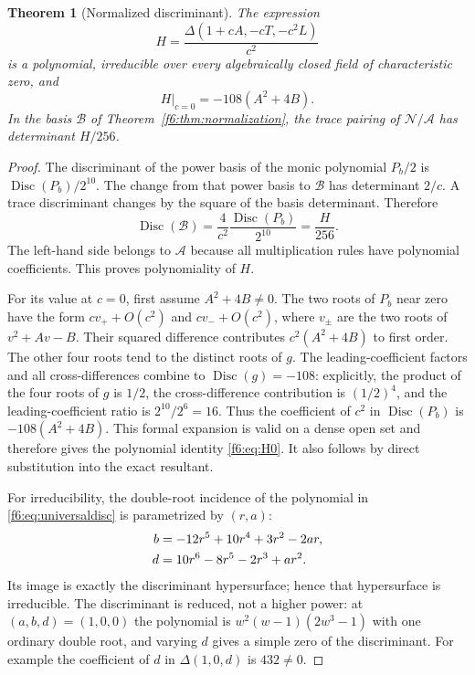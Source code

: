 \documentclass[11pt,a4paper]{article}
\newtheorem{theorem}{Theorem}[section]
\theoremstyle{definition}
\newcommand{\Disc}{\operatorname{Disc}}
\newcommand{\base}{\mathcal A}
\newcommand{\normal}{\mathcal N}
\begin{document}
\begin{theorem}[Normalized discriminant]\label{f6:thm:H}
The expression
\begin{equation}\label{f6:eq:H}
 H=\frac{\Delta(1+cA,-cT,-c^2L)}{c^2}
\end{equation}
is a polynomial, irreducible over every algebraically closed field of
characteristic zero, and
\begin{equation}\label{f6:eq:H0}
 H|_{c=0}=-108(A^2+4B).
\end{equation}
In the basis $\mathcal B$ of Theorem~\ref{f6:thm:normalization}, the trace
pairing of $\normal/\base$ has determinant $H/256$.
\end{theorem}
\begin{proof}
The discriminant of the power basis of the monic polynomial $P_b/2$ is
$\Disc(P_b)/2^{10}$. The change from that power basis to $\mathcal B$
has determinant $2/c$. A trace discriminant changes by the square of
the basis determinant. Therefore
\begin{equation}\label{f6:eq:discbasis}
 \Disc(\mathcal B)=\frac{4}{c^2}\frac{\Disc(P_b)}{2^{10}}
                 =\frac{H}{256}.
\end{equation}
The left-hand side belongs to $\base$ because all multiplication rules
have polynomial coefficients. This proves polynomiality of $H$.

For its value at $c=0$, first assume $A^2+4B\ne0$. The two roots of $P_b$
near zero have the form $cv_++O(c^2)$ and $cv_-+O(c^2)$, where
$v_\pm$ are the two roots of $v^2+Av-B$. Their squared difference
contributes $c^2(A^2+4B)$ to first order. The other four roots tend to
the distinct roots of $g$. The leading-coefficient factors and all
cross-differences combine to $\Disc(g)=-108$: explicitly, the product
of the four roots of $g$ is $1/2$, the cross-difference contribution is
$(1/2)^4$, and the leading-coefficient ratio is $2^{10}/2^6=16$.
Thus the coefficient of $c^2$ in $\Disc(P_b)$ is
$-108(A^2+4B)$. This formal expansion is valid on a dense open set and
therefore gives the polynomial identity \eqref{f6:eq:H0}. It also follows
by direct substitution into the exact resultant.

For irreducibility, the double-root incidence of the polynomial in
\eqref{f6:eq:universaldisc} is parametrized by $(r,a)$:
\begin{align}
 b&=-12r^5+10r^4+3r^2-2ar,\notag\\
 d&=10r^6-8r^5-2r^3+ar^2.\label{f6:eq:incidence}
\end{align}
Its image is exactly the discriminant hypersurface; hence that
hypersurface is irreducible. The discriminant is reduced, not a higher
power: at $(a,b,d)=(1,0,0)$ the polynomial is
$w^2(w-1)(2w^3-1)$ with one ordinary double root, and varying $d$ gives
a simple zero of the discriminant. For example the coefficient of $d$
in $\Delta(1,0,d)$ is $432\ne0$.


\end{proof}
\end{document}
